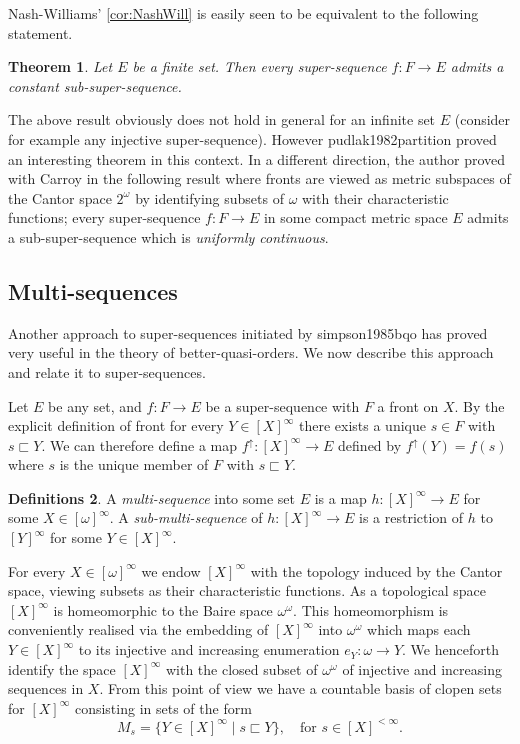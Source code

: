 \documentclass{article}%
\newcommand\textcite{}
\theoremstyle{plain}
\newtheorem{theorem}{Theorem}
\newtheorem{theorem}{Theorem}[section]
\theoremstyle{definition}
\newtheorem{definition}[theorem]{Definition}
\newtheorem{definition}[theorem]{Notation}
\newtheorem{definition}[theorem]{Notations}
\newtheorem{definition}[theorem]{Definitions}
\theoremstyle{remark}
\newcommand{\bai}{\omega^{\omega}}
\DeclareMathOperator{\upcl}{\uparrow}
\newcommand{\segs} {\sqsubset}
\newcommand{\finSub}[1] {[#1]^{<\infty}}
\newcommand{\infSub}[1]{[#1]^{\infty}}
\begin{document}
Nash-Williams' \cref{cor:NashWill} is easily seen to be equivalent to the following statement. 

\begin{theorem}\label{corollary:SuperNW}
Let $E$ be a finite set. Then every super-sequence $f:F\to E$ admits a constant sub-super-sequence.
\end{theorem}

The above result obviously does not hold in general for an infinite set $E$ (consider for example any injective super-sequence). However \textcite{pudlak1982partition} proved an interesting theorem in this context. In a different direction, the author proved with Carroy in \cite{CarroyYPFromWell} the following result where fronts are viewed as metric subspaces of the Cantor space $2^\omega$ by identifying subsets of $\omega$ with their characteristic functions; every super-sequence $f:F\to E$ in some compact metric space $E$ admits a sub-super-sequence which is \emph{uniformly continuous}.



\subsection{Multi-sequences}\label{sec:MultisSeqSimpson}

Another approach to super-sequences initiated by \textcite{simpson1985bqo} has proved very useful in the theory of better-quasi-orders. We now describe this approach and relate it to super-sequences.

Let $E$ be any set, and $f:F\to E$ be a super-sequence with $F$ a front on $X$. By the explicit definition of front for every $Y\in\infSub{X}$ there exists a unique $s\in F$ with $s\segs Y$. We can therefore define a map $f^{\upcl}:\infSub{X}\to E$ defined by $f^{\upcl}(Y)=f(s)$ where $s$ is the unique member of $F$ with $s\segs Y$.

\begin{definition}
A \emph{multi-sequence} into some set $E$ is a map $h:\infSub{X}\to E$ for some $X\in\infSub{\omega}$. A \emph{sub-multi-sequence} of $h:\infSub{X}\to E$ is a restriction of $h$ to $\infSub{Y}$ for some $Y\in\infSub{X}$.
\end{definition}

For every $X\in\infSub{\omega}$ we endow $\infSub{X}$ with the topology induced by the Cantor space, viewing subsets as their characteristic functions. As a topological space $\infSub{X}$ is homeomorphic to the Baire space $\bai$. This homeomorphism is conveniently realised via the embedding of $\infSub{X}$ into $\bai$ which maps each $Y\in \infSub{X}$ to its injective and increasing enumeration $e_{Y}:\omega \to Y$. We henceforth identify the space $\infSub{X}$ with the closed subset of $\bai$ of injective and increasing sequences in $X$. From this point of view we have a countable basis of clopen sets for $\infSub{X}$ consisting in sets of the form
\[
M_{s}=\{Y\in\infSub{X}\mid s\segs Y\}, \quad \text{for $s\in \finSub{X}$.}
\]
\end{document}
